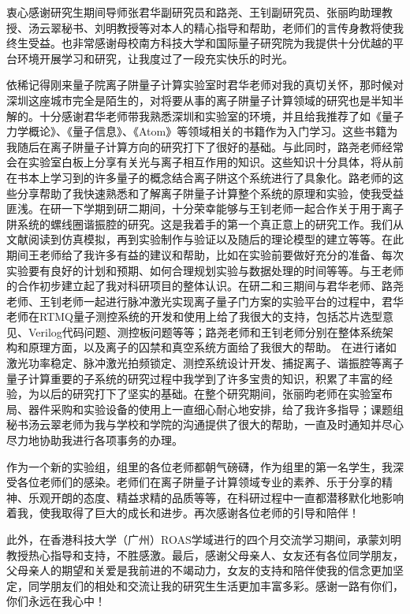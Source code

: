 
\begin{acknowledgements}
  衷心感谢研究生期间导师张君华副研究员和路尧、王钊副研究员、张丽昀助理教授、汤云翠秘书、刘明教授等对本人的精心指导和帮助，老师们的言传身教将使我终生受益。也非常感谢母校南方科技大学和国际量子研究院为我提供十分优越的平台环境开展学习和研究，让我度过了一段充实快乐的时光。

  依稀记得刚来量子院离子阱量子计算实验室时君华老师对我的真切关怀，那时候对深圳这座城市完全是陌生的，对将要从事的离子阱量子计算领域的研究也是半知半解的。十分感谢君华老师带我熟悉深圳和实验室的环境，并且给我推荐了如《量子力学概论》、《量子信息》、《Atom》等领域相关的书籍作为入门学习。这些书籍为我随后在离子阱量子计算方向的研究打下了很好的基础。与此同时，路尧老师经常会在实验室白板上分享有关光与离子相互作用的知识。这些知识十分具体，将从前在书本上学习到的许多量子的概念结合离子阱这个系统进行了具象化。路老师的这些分享帮助了我快速熟悉和了解离子阱量子计算整个系统的原理和实验，使我受益匪浅。在研一下学期到研二期间，十分荣幸能够与王钊老师一起合作关于用于离子阱系统的螺线圈谐振腔的研究。这是我着手的第一个真正意上的研究工作。我们从文献阅读到仿真模拟，再到实验制作与验证以及随后的理论模型的建立等等。在此期间王老师给了我许多有益的建议和帮助，比如在实验前要做好充分的准备、每次实验要有良好的计划和预期、如何合理规划实验与数据处理的时间等等。与王老师的合作初步建立起了我对科研项目的整体认识。在研二和三期间与君华老师、路尧老师、王钊老师一起进行脉冲激光实现离子量子门方案的实验平台的过程中，君华老师在RTMQ量子测控系统的开发和使用上给了我很大的支持，包括芯片选型意见、Verilog代码问题、测控板问题等等；路尧老师和王钊老师分别在整体系统架构和原理方面，以及离子的囚禁和真空系统方面给了我很大的帮助。
  在进行诸如激光功率稳定、脉冲激光拍频锁定、测控系统设计开发、捕捉离子、谐振腔等离子量子计算重要的子系统的研究过程中我学到了许多宝贵的知识，积累了丰富的经验，为以后的研究打下了坚实的基础。在整个研究期间，张丽昀老师在实验室布局、器件采购和实验设备的使用上一直细心耐心地安排，给了我许多指导；课题组秘书汤云翠老师为我与学校和学院的沟通提供了很大的帮助，一直及时通知并尽心尽力地协助我进行各项事务的办理。
  
  作为一个新的实验组，组里的各位老师都朝气磅礴，作为组里的第一名学生，我深受各位老师们的感染。老师们在离子阱量子计算领域专业的素养、乐于分享的精神、乐观开朗的态度、精益求精的品质等等，在科研过程中一直都潜移默化地影响着我，使我取得了巨大的成长和进步。再次感谢各位老师的引导和陪伴！



  此外，在香港科技大学（广州）ROAS学域进行的四个月交流学习期间，承蒙刘明教授热心指导和支持，不胜感激。最后，感谢父母亲人、女友还有各位同学朋友，父母亲人的期望和关爱是我前进的不竭动力，女友的支持和陪伴使我的信念更加坚定，同学朋友们的相处和交流让我的研究生生活更加丰富多彩。感谢一路有你们，你们永远在我心中！

\end{acknowledgements}
